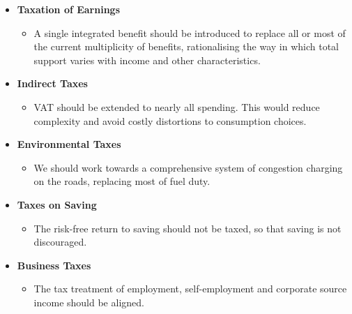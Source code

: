 \begin{frame}
	\begin{itemize}\setlength\itemsep{1em}
		\item \textbf{Taxation of Earnings}\medskip
		\begin{itemize}\setlength\itemsep{1em}
			\item A single integrated benefit should be introduced to replace all or most of the current multiplicity of benefits, rationalising the way in which total support varies with income and other characteristics.
		\end{itemize}
		\item \textbf{Indirect Taxes}\medskip
		\begin{itemize}\setlength\itemsep{1em}
			\item VAT should be extended to nearly all spending. This would reduce complexity and avoid costly distortions to consumption choices.
		\end{itemize}
	\end{itemize}
\end{frame}
\begin{frame}
	\begin{itemize}\setlength\itemsep{1em}
		\item \textbf{Environmental Taxes}\medskip
		\begin{itemize}\setlength\itemsep{1em}
			\item We should work towards a comprehensive system of congestion charging on the roads, replacing most of fuel duty.
		\end{itemize}
		\item \textbf{Taxes on Saving}\medskip
		\begin{itemize}\setlength\itemsep{1em}
			\item The risk-free return to saving should not be taxed, so that saving is not discouraged.
		\end{itemize}
		\item \textbf{Business Taxes}\medskip
		\begin{itemize}\setlength\itemsep{1em}
			\item The tax treatment of employment, self-employment and corporate source income should be aligned.
		\end{itemize}
	\end{itemize}
\end{frame}
